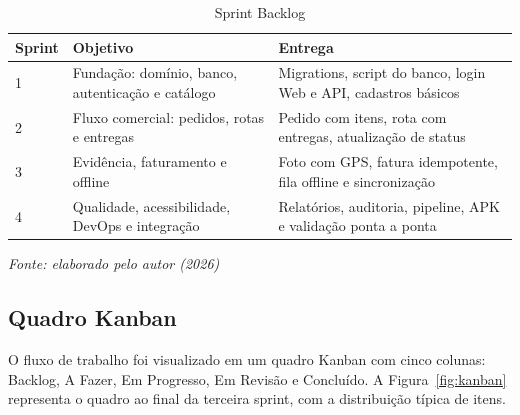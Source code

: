 \begin{table}[H]
  \centering
  \caption{Sprint Backlog}
  \label{tab:sprints}
  \fontsize{9.5}{11.5}\selectfont
  \begin{tabular}{L{1.4cm}L{6.6cm}L{6.4cm}}
    \toprule
    \textbf{Sprint} & \textbf{Objetivo} & \textbf{Entrega} \\
     & Fundação: domínio, banco, autenticação e catálogo & Migrations,
      script do banco, login Web e API, cadastros básicos \\
    2 & Fluxo comercial: pedidos, rotas e entregas & Pedido com itens, rota
      com entregas, atualização de status \\
    3 & Evidência, faturamento e offline & Foto com GPS, fatura idempotente,
      fila offline e sincronização \\
    4 & Qualidade, acessibilidade, DevOps e integração & Relatórios,
      auditoria, pipeline, APK e validação ponta a ponta \\
    \bottomrule
  \end{tabular}

  \vspace{2pt}
  {\fontsize{10}{12}\selectfont\itshape Fonte: elaborado pelo autor (2026)}
\end{table}

\subsection{Quadro Kanban}

O fluxo de trabalho foi visualizado em um quadro Kanban com cinco colunas:
Backlog, A Fazer, Em Progresso, Em Revisão e Concluído. A Figura~\ref{fig:kanban}
representa o quadro ao final da terceira sprint, com a distribuição típica de
itens.

